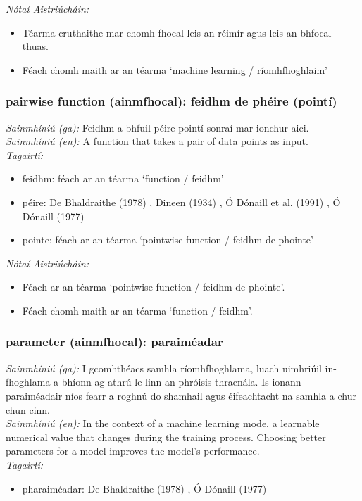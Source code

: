  \noindent \textit{Nótaí Aistriúcháin:}
\begin{itemize}
	\item Téarma cruthaithe mar chomh-fhocal leis an réimír agus leis an bhfocal thuas.
	\item Féach chomh maith ar an téarma `machine learning / ríomhfhoghlaim'
\end{itemize}


\subsubsection*{pairwise function (ainmfhocal): feidhm de phéire (pointí)}
 \noindent \textit{Sainmhíniú (ga):} Feidhm a bhfuil péire pointí sonraí mar ionchur aici.
\\
 \noindent \textit{Sainmhíniú (en):} A function that takes a pair of data points as input.
\\
 \noindent \textit{Tagairtí:}
\begin{itemize}
	\item feidhm: féach ar an téarma `function / feidhm'
	\item péire: De Bhaldraithe (1978) \cite{de-bhaldraithe}, Dineen (1934) \cite{dineen}, Ó Dónaill et al. (1991) \cite{focloir-beag}, Ó Dónaill (1977) \cite{odonaill}
	\item pointe: féach ar an téarma `pointwise function / feidhm de phointe'
\end{itemize}

 \noindent \textit{Nótaí Aistriúcháin:}
\begin{itemize}
	\item Féach ar an téarma `pointwise function / feidhm de phointe'.
	\item Féach chomh maith ar an téarma `function / feidhm'.
\end{itemize}


\subsubsection*{parameter (ainmfhocal): paraiméadar}
 \noindent \textit{Sainmhíniú (ga):} I gcomhthéacs samhla ríomhfhoghlama, luach uimhriúil in-fhoghlama a bhíonn ag athrú le linn an phróisis thraenála. Is ionann paraiméadair níos fearr a roghnú do shamhail agus éifeachtacht na samhla a chur chun cinn.
\\
 \noindent \textit{Sainmhíniú (en):} In the context of a machine learning mode, a learnable numerical value that changes during the training process. Choosing better parameters for a model improves the model's performance.
\\
 \noindent \textit{Tagairtí:}
\begin{itemize}
	\item pharaiméadar: De Bhaldraithe (1978) \cite{de-bhaldraithe}, Ó Dónaill (1977) \cite{odonaill}
\end{itemize}

